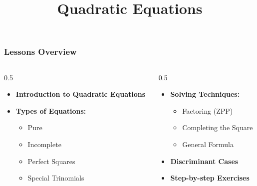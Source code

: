 \documentclass[10pt]{beamer}
\title{Quadratic Equations}
\author{}
\date{}
\begin{document}
	
	\frame{\titlepage}
\begin{frame}
	\frametitle{Lessons Overview}
	
	
	\begin{block}{}
		\begin{columns}
			\begin{column}{0.5\textwidth}
				\begin{itemize}
					\item \textbf{Introduction to Quadratic Equations}
					\item \textbf{Types of Equations:}
					\begin{itemize}
						\item Pure
						\item Incomplete
						\item Perfect Squares
						\item Special Trinomials
					\end{itemize}
				\end{itemize}
			\end{column}
			\begin{column}{0.5\textwidth}
				\begin{itemize}
					\item \textbf{Solving Techniques:}
					\begin{itemize}
						\item Factoring (ZPP)
						\item Completing the Square
						\item General Formula
					\end{itemize}
					\item \textbf{Discriminant Cases}
					\item \textbf{Step-by-step Exercises}
				\end{itemize}
			\end{column}
		\end{columns}
	\end{block}
\end{frame}
\end{document}
